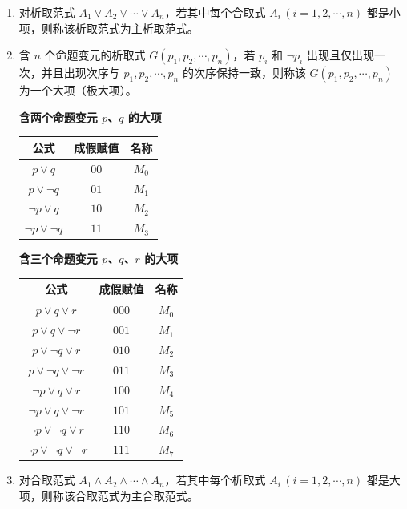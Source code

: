 \begin{enumerate}
\begin{enumerate}
	\end{enumerate}
	
	
	\item[\textbf{def 2：}] 对析取范式 $A_1 \lor A_2 \lor \cdots \lor A_n$，若其中每个合取式 $A_i\,(i=1,2,\cdots,n)$ 都是小项，则称该析取范式为主析取范式。
	
	
	\item[\textbf{def 3：}] 含 \(n\) 个命题变元的析取式 \(G(p_1,p_2,\cdots,p_n)\)，若 \(p_i\) 和 \(\neg p_i\) 出现且仅出现一次，并且出现次序与 \(p_1,p_2,\cdots,p_n\) 的次序保持一致，则称该 \(G(p_1,p_2,\cdots,p_n)\) 为一个大项（极大项）。
	\begin{center}
		\textbf{含两个命题变元 \(p\)、\(q\) 的大项}
	\end{center}
	
	\begin{center}
		\begin{tabular}{|c|c|c|}
			\hline
			\textbf{公式} & \textbf{成假赋值} & \textbf{名称} \\
			\hline
			\(p\vee q\) & \(00\) & \(M_0\) \\
			\hline
			\(p\vee \neg q\) & \(01\) & \(M_1\) \\
			\hline
			\(\neg p\vee q\) & \(10\) & \(M_2\) \\
			\hline
			\(\neg p\vee \neg q\) & \(11\) & \(M_3\) \\
			\hline
		\end{tabular}
	\end{center}
	
	\begin{center}
		\textbf{含三个命题变元 \(p\)、\(q\)、\(r\) 的大项}
	\end{center}
	\begin{center}
		\begin{tabular}{|c|c|c|}
			\hline
			\textbf{公式} & \textbf{成假赋值} & \textbf{名称} \\
			\hline
			\(p\vee q\vee r\) & \(000\) & \(M_0\) \\
			\hline
			\(p\vee q\vee \neg r\) & \(001\) & \(M_1\) \\
			\hline
			\(p\vee \neg q\vee r\) & \(010\) & \(M_2\) \\
			\hline
			\(p\vee \neg q\vee \neg r\) & \(011\) & \(M_3\) \\
			\hline
			\(\neg p\vee q\vee r\) & \(100\) & \(M_4\) \\
			\hline
			\(\neg p\vee q\vee \neg r\) & \(101\) & \(M_5\) \\
			\hline
			\(\neg p\vee \neg q\vee r\) & \(110\) & \(M_6\) \\
			\hline
			\(\neg p\vee \neg q\vee \neg r\) & \(111\) & \(M_7\) \\
			\hline
		\end{tabular}
	\end{center}
	
	\item[\textbf{def 2：}] 对合取范式 $A_1 \land A_2 \land \cdots \land A_n$，若其中每个析取式 $A_i\,(i=1,2,\cdots,n)$ 都是大项，则称该合取范式为主合取范式。
	
\end{enumerate}



